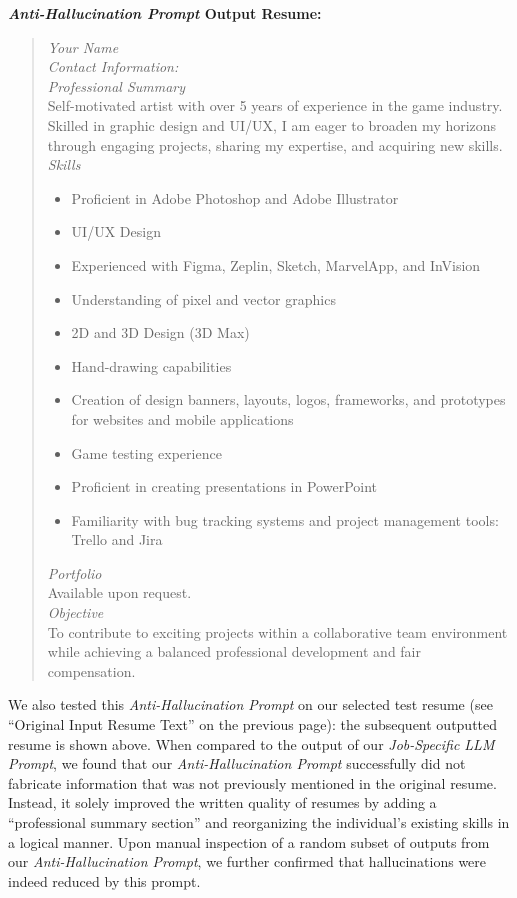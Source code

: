     \textbf{\textit{Anti-Hallucination Prompt} Output Resume:}
    \begin{quote}
        \textit{Your Name} \\
        \textit{Contact Information:} \\
        \textit{Professional Summary} \\
        Self-motivated artist with over 5 years of experience in the game industry. Skilled in graphic design and UI/UX, I am eager to broaden my horizons through engaging projects, sharing my expertise, and acquiring new skills. \\
    
        \textit{Skills} 
        \begin{itemize}
            \item Proficient in Adobe Photoshop and Adobe Illustrator
            \item UI/UX Design
            \item Experienced with Figma, Zeplin, Sketch, MarvelApp, and InVision
            \item Understanding of pixel and vector graphics
            \item 2D and 3D Design (3D Max)
            \item Hand-drawing capabilities
            \item Creation of design banners, layouts, logos, frameworks, and prototypes for websites and mobile applications
            \item Game testing experience
            \item Proficient in creating presentations in PowerPoint
            \item Familiarity with bug tracking systems and project management tools: Trello and Jira
        \end{itemize}
        \textit{Portfolio} \\
        Available upon request. \\

        \textit{Objective} \\
        To contribute to exciting projects within a collaborative team environment while achieving a balanced professional development and fair compensation.
    \end{quote}

    We also tested this \textit{Anti-Hallucination Prompt} on our selected test resume (see ``Original Input Resume Text'' on the previous page): the subsequent outputted resume is shown above. When compared to the output of our \textit{Job-Specific LLM Prompt}, we found that our \textit{Anti-Hallucination Prompt} successfully did not fabricate information that was not previously mentioned in the original resume. Instead, it solely improved the written quality of resumes by adding a ``professional summary section'' and reorganizing the individual's existing skills in a logical manner. Upon manual inspection of a random subset of outputs from our \textit{Anti-Hallucination Prompt}, we further confirmed that hallucinations were indeed reduced by this prompt.

